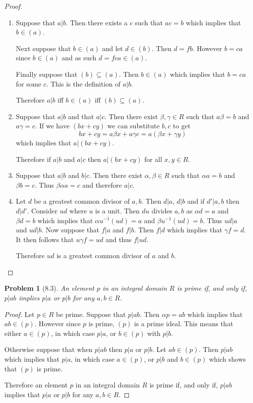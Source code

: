 \documentclass[10pt]{article}
\newcommand{\sk}{\vskip 10mm}
\theoremstyle{plain}
\newtheorem{problem}{Problem}
\theoremstyle{remark}
\begin{document}
\begin{proof}
  \begin{enumerate}
  \item Suppose that $a|b$. Then there exists a $c$ such that $ac=b$ which implies
    that $b\in (a)$.

    Next suppose that $b\in(a)$ and let $d\in (b)$. Then $d=fb$. However $b=ca$ since
    $b\in (a)$ and as such $d=fca\in (a)$.

    Finally suppose that $(b)\subseteq (a)$. Then $b\in(a)$ which implies that $b=ca$ for
    some $c$. This is the definition of $a|b$.

    Therefore $a|b$ iff $b\in(a)$ iff $(b)\subseteq(a)$.
    
  \item Suppose that $a|b$ and that $a|c$. Then there exist $\beta,\gamma\in R$ such that
    $a\beta = b$ and $a\gamma = c$. If we have $(bx+cy)$ we can substitute $b,c$ to get
    \[ bx+cy = a\beta x + a\gamma c = a(\beta x + \gamma y)\]
    which implies that $a|(bx+cy)$.

    Therefore if $a|b$ and $a|c$ then $a|(bx+cy)$ for all $x,y\in R$.

  \item Suppose that $a|b$ and $b|c$. Then there exist $\alpha,\beta\in R$ such that
    $\alpha a = b$ and $\beta b = c$. Thus $\beta\alpha a =c$ and therefore $a|c$.

  \item Let $d$ be a greatest common divisor of $a,b$. Then
    $d|a$, $d|b$ and if $d'|a,b$ then $d|d'$. Consider $ud$ where $u$ is a unit.
    Then $du$ divides $a,b$ as $\alpha d=a$ and $\beta d=b$ which implies that
    $\alpha u^{-1}(ud) =a $ and $\beta u^{-1}(ud) = b$. Thus $ud|a$ and $ud|b$.
    Now suppose that $f|a$ and $f|b$. Then $f|d$ which implies that
    $\gamma f = d$. It then follows that $u\gamma f=ud$ and thus $f|ud$.

    Therefore $ud$ is a greatest common divisor of $a$ and $b$.
  \end{enumerate}
\end{proof}

\sk

\begin{problem}[8.3]
  An element $p$ in an integral domain $R$ is prime if, and only if,
  $p|ab$ implies $p|a$ or $p|b$ for any $a,b\in R$.
\end{problem}

\begin{proof}
  Let $p\in R$ be prime. Suppose that $p|ab$. Then $\alpha p=ab$ which implies
  that $ab\in (p)$. However since $p$ is prime, $(p)$ is a prime ideal.
  This means that either $a\in (p)$, in which case $p|a$, or $b\in (p)$ with $p|b$.

  Otherwise suppose that when $p|ab$ then $p|a$ or $p|b$. Let $ab\in (p)$. Then
  $p|ab$ which implies that $p|a$, in which case $a\in (p)$, or $p|b$ and $b\in (p)$
  which shows that $(p)$ is prime.

  Therefore an element $p$ in an integral domain $R$ is prime if, and only if,
  $p|ab$ implies that $p|a$ or $p|b$ for any $a,b\in R$.
\end{proof}
\end{document}
